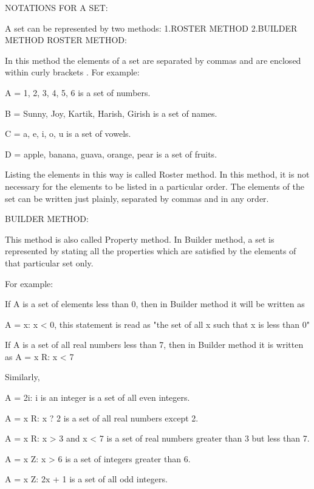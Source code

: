 

NOTATIONS FOR A SET:

A set can be represented by two methods:
1.ROSTER METHOD
2.BUILDER METHOD
ROSTER METHOD:

In this method the elements of a set are separated by commas and are enclosed within curly brackets { }. For example:

A = {1, 2, 3, 4, 5, 6} is a set of numbers.

B = {Sunny, Joy, Kartik, Harish, Girish} is a set of names.

C = {a, e, i, o, u} is a set of vowels.

D = {apple, banana, guava, orange, pear} is a set of fruits.

Listing the elements in this way is called Roster method. In this method, it is not necessary for the elements to be listed in a particular order. The elements of the set can be written just plainly, separated by commas and in any order.


BUILDER METHOD:

This method is also called Property method. In Builder method, a set is represented by stating all the properties which are satisfied by the elements of that particular set only.

For example:

If A is a set of elements less than 0, then in Builder method it will be written as

A = {x: x < 0}, this statement is read as "the set of all x such that x is less than 0"

If A is a set of all real numbers less than 7, then in Builder method it is written as A = {x   R: x < 7}

Similarly,

A = {2i: i is an integer} is a set of all even integers.

A = {x   R: x ? 2} is a set of all real numbers except 2.

A = {x   R: x > 3 and x < 7} is a set of real numbers greater than 3 but less than 7.

A = {x   Z: x > 6} is a set of integers greater than 6.

A = {x   Z: 2x + 1} is a set of all odd integers.





